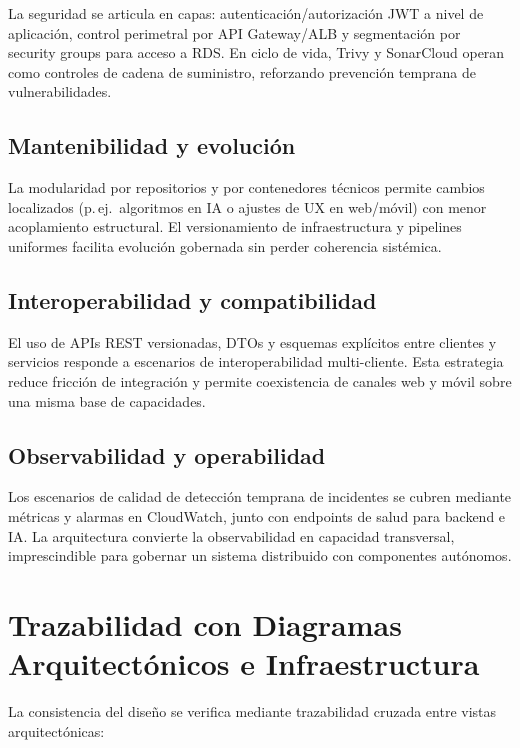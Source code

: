 \documentclass[12pt, letterpaper]{article}
\begin{document}
La seguridad se articula en capas: autenticación/autorización JWT a nivel de aplicación, control perimetral por API Gateway/ALB y segmentación por security groups para acceso a RDS. En ciclo de vida, Trivy y SonarCloud operan como controles de cadena de suministro, reforzando prevención temprana de vulnerabilidades.

\subsection{Mantenibilidad y evolución}

La modularidad por repositorios y por contenedores técnicos permite cambios localizados (p.\,ej.\ algoritmos en IA o ajustes de UX en web/móvil) con menor acoplamiento estructural. El versionamiento de infraestructura y pipelines uniformes facilita evolución gobernada sin perder coherencia sistémica.

\subsection{Interoperabilidad y compatibilidad}

El uso de APIs REST versionadas, DTOs y esquemas explícitos entre clientes y servicios responde a escenarios de interoperabilidad multi-cliente. Esta estrategia reduce fricción de integración y permite coexistencia de canales web y móvil sobre una misma base de capacidades.

\subsection{Observabilidad y operabilidad}

Los escenarios de calidad de detección temprana de incidentes se cubren mediante métricas y alarmas en CloudWatch, junto con endpoints de salud para backend e IA. La arquitectura convierte la observabilidad en capacidad transversal, imprescindible para gobernar un sistema distribuido con componentes autónomos.

\section{Trazabilidad con Diagramas Arquitectónicos e Infraestructura}

La consistencia del diseño se verifica mediante trazabilidad cruzada entre vistas arquitectónicas:
\end{document}
